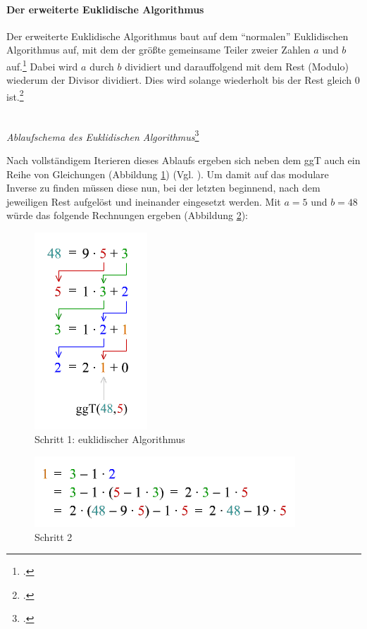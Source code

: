 \documentclass{scrarticle} %
\begin{document}
        \paragraph{Der erweiterte Euklidische Algorithmus} %
            Der erweiterte Euklidische Algorithmus baut auf dem \enquote{normalen} Euklidischen Algorithmus auf, mit dem der größte gemeinsame Teiler zweier Zahlen $a$ und $b$ auf.\footcite[Vgl.][]{erweA} Dabei wird $a$ durch $b$ dividiert und darauffolgend mit dem Rest (Modulo) wiederum der Divisor dividiert. Dies wird solange wiederholt bis der Rest gleich $0$ ist.\footcite[Vgl.][]{matbib-eka}
            \begin{center}
            \\
            \emph{Ablaufschema des Euklidischen Algorithmus}\footcite{zum2020}\\                   
            \end{center}
            Nach vollständigem Iterieren dieses Ablaufs ergeben sich neben dem ggT auch ein Reihe von Gleichungen (Abbildung \ref{fig:euklid}) (Vgl. \cite{erweA}). Um damit auf das modulare Inverse zu finden müssen diese nun, bei der letzten beginnend, nach dem jeweiligen Rest aufgelöst und ineinander eingesetzt werden. Mit $a=5$ und $b=48$ würde das folgende Rechnungen ergeben (Abbildung \ref{fig:erweuklid}):\\
            \begin{figure}[h!]
                \centering
                \includegraphics{content/euklid.png}
                \caption{Schritt 1: euklidischer Algorithmus\protect\footnotemark}
                \label{fig:euklid}
            \end{figure}
            \begin{figure}[h!]
                \centering
                \includegraphics{content/erweuklid.png}
                \caption{Schritt 2\protect\footnotemark}
                \label{fig:erweuklid}
            \end{figure}
\end{document}
